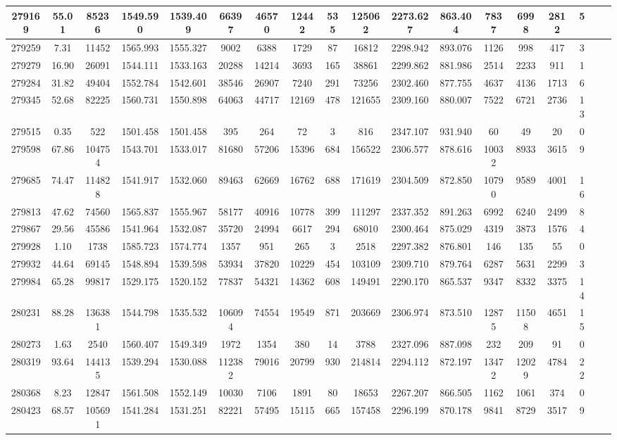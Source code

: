 \documentclass[10pt]{extarticle}
\begin{document}
\begin{longtable}{|c|c|c|c|c|c|c|c|c|c|c|c|c|c|c|c|c|c|}
\hline 
279169&55.01&85236&1549.590&1539.409&66397&46570&12442&535&125062&2273.627&863.404&7837&6998&2812&5 \\ 
\hline 
279259&7.31&11452&1565.993&1555.327&9002&6388&1729&87&16812&2298.942&893.076&1126&998&417&3 \\ 
\hline 
279279&16.90&26091&1544.111&1533.163&20288&14214&3693&165&38861&2299.862&881.986&2514&2233&911&1 \\ 
\hline 
279284&31.82&49404&1552.784&1542.601&38546&26907&7240&291&73256&2302.460&877.755&4637&4136&1713&6 \\ 
\hline 
279345&52.68&82225&1560.731&1550.898&64063&44717&12169&478&121655&2309.160&880.007&7522&6721&2736&13 \\ 
\hline 
279515&0.35&522&1501.458&1501.458&395&264&72&3&816&2347.107&931.940&60&49&20&0 \\ 
\hline 
279598&67.86&104754&1543.701&1533.017&81680&57206&15396&684&156522&2306.577&878.616&10032&8933&3615&9 \\ 
\hline 
279685&74.47&114828&1541.917&1532.060&89463&62669&16762&688&171619&2304.509&872.850&10790&9589&4001&16 \\ 
\hline 
279813&47.62&74560&1565.837&1555.967&58177&40916&10778&399&111297&2337.352&891.263&6992&6240&2499&8 \\ 
\hline 
279867&29.56&45586&1541.964&1532.087&35720&24994&6617&294&68010&2300.464&875.029&4319&3873&1576&4 \\ 
\hline 
279928&1.10&1738&1585.723&1574.774&1357&951&265&3&2518&2297.382&876.801&146&135&55&0 \\ 
\hline 
279932&44.64&69145&1548.894&1539.598&53934&37820&10229&454&103109&2309.710&879.764&6287&5631&2299&3 \\ 
\hline 
279984&65.28&99817&1529.175&1520.152&77837&54321&14362&608&149491&2290.170&865.537&9347&8332&3375&14 \\ 
\hline 
280231&88.28&136381&1544.798&1535.532&106094&74554&19549&871&203669&2306.974&873.510&12875&11508&4651&15 \\ 
\hline 
280273&1.63&2540&1560.407&1549.349&1972&1354&380&14&3788&2327.096&887.098&232&209&91&0 \\ 
\hline 
280319&93.64&144135&1539.294&1530.088&112382&79016&20799&930&214814&2294.112&872.197&13472&12029&4784&22 \\ 
\hline 
280368&8.23&12847&1561.508&1552.149&10030&7106&1891&80&18653&2267.207&866.505&1162&1061&374&0 \\ 
\hline 
280423&68.57&105691&1541.284&1531.251&82221&57495&15115&665&157458&2296.199&870.178&9841&8729&3517&9 \\ 

\end{longtable}
\end{document}

